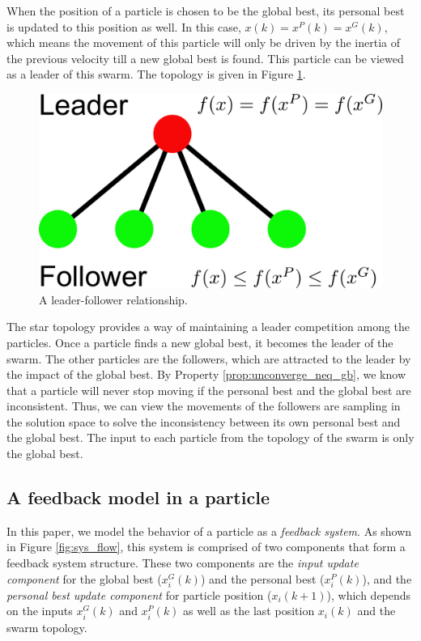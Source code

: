When the position of a particle is chosen to be the global best, its personal best is updated to this position as well.
In this case, $ x(k) = x^{P}(k) = x^{G}(k) $, which means the movement of this particle will only be driven by the inertia of the previous velocity till a new global best is found.
This particle can be viewed as a leader of this swarm.
The topology is given in Figure \ref{fig:leader_follower}.
\begin{figure}[tbph]
\centering
\includegraphics[width=0.5\linewidth]{./fig/leader_follower}
\caption{A leader-follower relationship.}
\label{fig:leader_follower}
\end{figure}

The star topology provides a way of maintaining a leader competition among the particles.
Once a particle finds a new global best, it becomes the leader of the swarm.
The other particles are the followers, which are attracted to the leader by the impact of the global best.
By Property \ref{prop:unconverge_neq_gb}, we know that a particle will never stop moving if the personal best and the global best are inconsistent.
Thus, we can view the movements of the followers are sampling in the solution space to solve the inconsistency between its own personal best and the global best.
The input to each particle from the topology of the swarm is only the global best.

\subsection{A feedback model in a particle}

In this paper, we model the behavior of a particle as a \emph{feedback system}.
As shown in Figure \ref{fig:sys_flow}, this system is comprised of two components that form a feedback system structure.
These two components are the 
\emph{input update component} for the global best ($ x^{G}_{i}(k) $) and the personal best ($ x^{P}_{i}(k) $), and the 
\emph{personal best update component} for particle position ($ x_{i}(k+1) $), which depends on the inputs $ x^{G}_{i}(k) $ and $ x^{P}_{i}(k) $ as well as the last position $ x_{i}(k) $ and the swarm topology.


